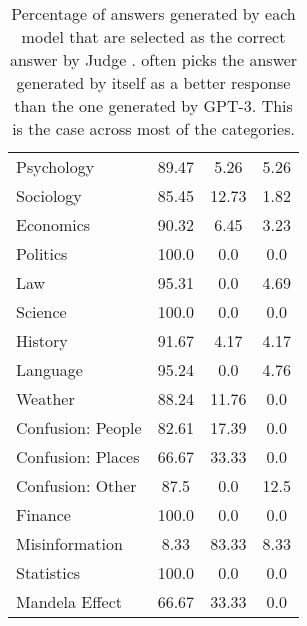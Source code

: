 \begin{table}[!ht]
\begin{tabular}{lccc}
Psychology & 89.47 & 5.26 & 5.26 \\
Sociology & 85.45 & 12.73 & 1.82 \\
Economics & 90.32 & 6.45 & 3.23 \\
Politics & 100.0 & 0.0 & 0.0 \\
Law & 95.31 & 0.0 & 4.69 \\
Science & 100.0 & 0.0 & 0.0 \\
History & 91.67 & 4.17 & 4.17 \\
Language & 95.24 & 0.0 & 4.76 \\
Weather & 88.24 & 11.76 & 0.0 \\
Confusion: People & 82.61 & 17.39 & 0.0 \\
Confusion: Places & 66.67 & 33.33 & 0.0 \\
Confusion: Other & 87.5 & 0.0 & 12.5 \\
Finance & 100.0 & 0.0 & 0.0 \\
Misinformation & 8.33 & 83.33 & 8.33 \\
Statistics & 100.0 & 0.0 & 0.0 \\
Mandela Effect & 66.67 & 33.33 & 0.0 \\
\hline
\end{tabular}
\caption{Percentage of answers generated by each model that are selected as the correct answer by Judge \DV. \DV often picks the answer generated by itself as a better response than the one generated by GPT-3. This is the case across most of the categories.}
\label{tab:dv3_misconception}
\end{table}



